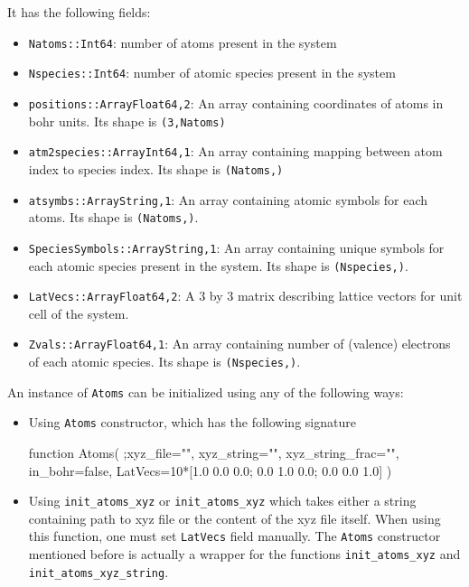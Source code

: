\documentclass[a4paper,10pt,twocolumn]{paper}
\newcommand{\jlcode}[1]{\texttt{#1}}
\begin{document}
It has the following fields:
\begin{itemize}
%
\item \jlcode{Natoms::Int64}: number of atoms present in the system
%
\item \jlcode{Nspecies::Int64}: number of atomic species present in the system
%
\item \jlcode{positions::Array{Float64,2}}: An array containing coordinates of atoms
  in bohr units. Its shape is \jlcode{(3,Natoms)}
%
\item \jlcode{atm2species::Array{Int64,1}}: An array containing mapping between atom index
  to species index. Its shape is \jlcode{(Natoms,)}
%
\item \jlcode{atsymbs::Array{String,1}}: An array containing atomic symbols for each atoms.
  Its shape is \jlcode{(Natoms,)}.
%
\item \jlcode{SpeciesSymbols::Array{String,1}}: An array containing unique symbols
  for each atomic species present in the system. Its shape is \jlcode{(Nspecies,)}.
%
\item \jlcode{LatVecs::Array{Float64,2}}: A 3 by 3 matrix describing lattice vectors for unit
  cell of the system.
%
\item \jlcode{Zvals::Array{Float64,1}}: An array containing number of (valence)
  electrons of each atomic species. Its shape is \verb|(Nspecies,)|.
\end{itemize}

An instance of \jlcode{Atoms} can be initialized using any of the following ways:

\begin{itemize}
\item Using \jlcode{Atoms} constructor, which has the following signature
%
\begin{juliacode}
function Atoms( ;xyz_file="", xyz_string="", xyz_string_frac="",
                in_bohr=false,
                LatVecs=10*[1.0 0.0 0.0; 0.0 1.0 0.0; 0.0 0.0 1.0] )
\end{juliacode}
%
\item Using \jlcode{init_atoms_xyz} or \jlcode{init_atoms_xyz}
  which takes either
  a string containing path to xyz file or the content of the xyz file
  itself. When using this function, one must set \jlcode{LatVecs}
  field manually.
  The \jlcode{Atoms} constructor mentioned before is actually
  a wrapper for the functions
  \jlcode{init_atoms_xyz} and \jlcode{init_atoms_xyz_string}.
\end{itemize}
\end{document}
